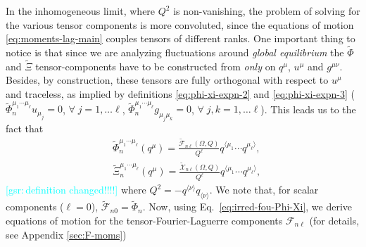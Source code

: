 \documentclass[aps,prd,preprint,nofootinbib,amsmath,amssymb,showpacs,longbibliography,singlecolumn,superscriptaddress,10pt]{revtex4-1}
\theoremstyle{plain}
\theoremstyle{definition}
\newcommand{\gsr}[1]{{\textcolor{cyan}{[gsr:\,{#1}]}}}
\begin{document}
In the inhomogeneous limit, where $Q^{2}$ is non-vanishing, the problem of solving for the various tensor components is more convoluted, since the equations of motion \eqref{eq:moments-lag-main} couples tensors of different ranks. One important thing to notice is that since we are analyzing fluctuations around \textit{global equilibrium} the $\widetilde\Phi$ and $\widetilde\Xi$ tensor-components have to be constructed from \emph{only} on $q^{\mu}$, $u^{\mu}$ and $g^{\mu \nu}$. Besides, by construction, these tensors are fully orthogonal with respect to $u^{\mu}$ and traceless, as implied by definitions \eqref{eq:phi-xi-expn-2} and \eqref{eq:phi-xi-expn-3} ($\widetilde{\Phi}_{n}^{\mu_{1} \cdots \mu_{\ell}}u_{\mu_{j}} = 0$, $\forall \; j=1, \ldots \ell$,  $\widetilde{\Phi}_{n}^{\mu_{1} \cdots \mu_{\ell}}g_{\mu_{j} \mu_{k}} = 0$, $\forall \; j,k =1, \ldots \ell$). This leads us to the fact that 
%
\begin{subequations}
\label{eq:irred-fou-Phi-Xi}
\begin{align}
&
\label{eq:irred-fou-Phi-Xi-1}
\widetilde{\Phi}_{n}^{\mu_{1} \cdots \mu_{\ell}} (q^{\mu})
=
\frac{\widetilde{\mathcal{F}}_{n\ell}(\Omega, Q)}{Q^{\ell}}
q^{\langle \mu_{1}} \cdots q^{ \mu_{\ell} \rangle},
\\
&
\label{eq:irred-fou-Phi-Xi-2}
\widetilde{\Xi}_{n}^{\mu_{1} \cdots \mu_{\ell}} (q^{\mu}) = \frac{\widetilde{\mathcal{X}}_{n\ell}(\Omega, Q)}{Q^{\ell}}
q^{\langle \mu_{1}} \cdots q^{ \mu_{\ell} \rangle},
\end{align}    
\end{subequations}
%
\gsr{definition changed!!!!}
where $Q^{2}= - q^{\langle \nu \rangle} q_{\langle \nu \rangle}$. %
We note that, for scalar components ($\ell = 0$), $\widetilde{\mathcal{F}}_{n0} = \widetilde{\Phi}_{n}$. Now, using Eq.~\eqref{eq:irred-fou-Phi-Xi}, we derive equations of motion for the tensor-Fourier-Laguerre components $\mathcal{F}_{n \ell}$  (for details, see Appendix \ref{sec:F-moms})
%
\end{document}
